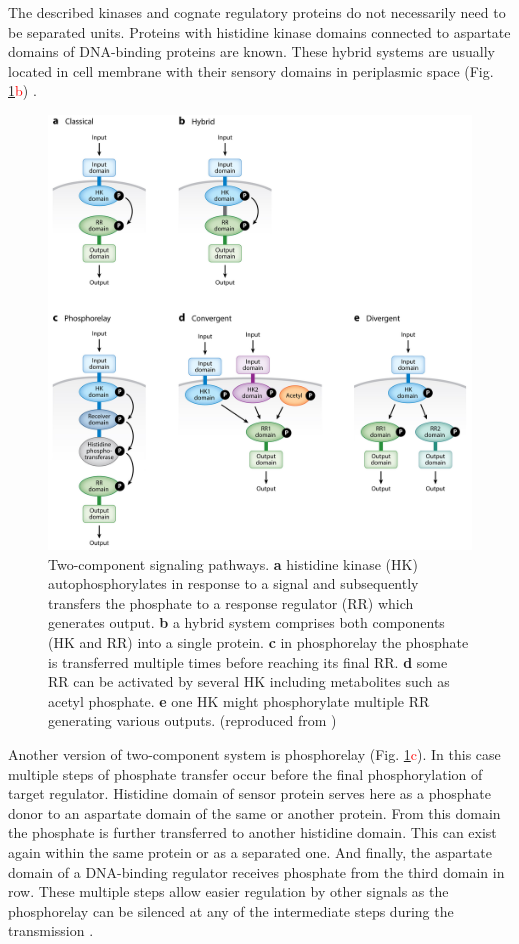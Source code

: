The described kinases and cognate regulatory proteins do not necessarily need to be separated units.
Proteins with histidine kinase domains connected to aspartate domains of DNA-binding proteins are known.
These hybrid systems are usually located in cell membrane with their sensory domains in periplasmic space (Fig. \ref{two}\textcolor{red}{b}) \cite{lynch2012prioritization, hirano2013regulon}.

\begin{figure}[h!]
  \centering
  \includegraphics[scale=0.85]{text/Pictures/TwoComponent.jpeg}
	\caption{Two-component signaling pathways. \textbf{a} histidine kinase (HK) autophosphorylates in response to a signal and subsequently transfers the phosphate to a response regulator (RR) which generates output. \textbf{b} a hybrid system comprises both components (HK and RR) into a single protein. \textbf{c} in phosphorelay the phosphate is transferred multiple times before reaching its final RR. \textbf{d} some RR can be activated by several HK including metabolites such as acetyl phosphate. \textbf{e} one HK might phosphorylate multiple RR generating various outputs. (reproduced from \cite{groisman2016feedback})}
	\label{two}
\end{figure}

Another version of two-component system is phosphorelay (Fig. \ref{two}\textcolor{red}{c}).
In this case multiple steps of phosphate transfer occur before the final phosphorylation of target regulator.
Histidine domain of sensor protein serves here as a phosphate donor to an aspartate domain of the same or another protein.
From this domain the phosphate is further transferred to another histidine domain.
This can exist again within the same protein or as a separated one.
And finally, the aspartate domain of a DNA-binding regulator receives phosphate from the third domain in row.
These multiple steps allow easier regulation by other signals as the phosphorelay can be silenced at any of the intermediate steps during the transmission \cite{perego2001pentapeptide, groisman2016feedback}.

